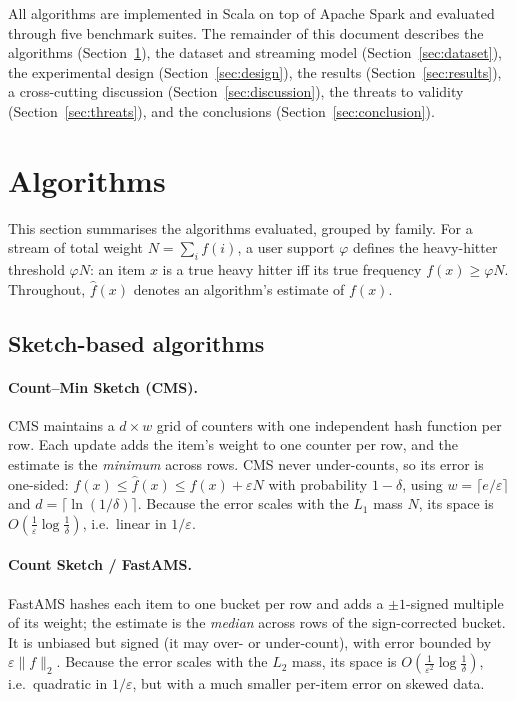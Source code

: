 \documentclass[12pt]{article}
\begin{document}
All algorithms are implemented in Scala on top of Apache Spark and evaluated
through five benchmark suites. The remainder of this document describes the
algorithms (Section~\ref{sec:algorithms}), the dataset and streaming model
(Section~\ref{sec:dataset}), the experimental design
(Section~\ref{sec:design}), the results (Section~\ref{sec:results}), a
cross-cutting discussion (Section~\ref{sec:discussion}), the threats to validity
(Section~\ref{sec:threats}), and the conclusions (Section~\ref{sec:conclusion}).

\section{Algorithms}
\label{sec:algorithms}

This section summarises the algorithms evaluated, grouped by family. For a
stream of total weight $N=\sum_i f(i)$, a user support $\varphi$ defines the
heavy-hitter threshold $\varphi N$: an item $x$ is a true heavy hitter iff its
true frequency $f(x) \ge \varphi N$. Throughout, $\hat f(x)$ denotes an
algorithm's estimate of $f(x)$.

\subsection{Sketch-based algorithms}

\paragraph{Count--Min Sketch (CMS).}
CMS maintains a $d \times w$ grid of counters with one independent hash function
per row. Each update adds the item's weight to one counter per row, and the
estimate is the \emph{minimum} across rows. CMS never under-counts, so its error
is one-sided: $f(x) \le \hat f(x) \le f(x) + \varepsilon N$ with probability
$1-\delta$, using $w=\lceil e/\varepsilon\rceil$ and $d=\lceil\ln(1/\delta)\rceil$.
Because the error scales with the $L_1$ mass $N$, its space is
$O\!\left(\tfrac{1}{\varepsilon}\log\tfrac{1}{\delta}\right)$, i.e.\ linear in
$1/\varepsilon$.

\paragraph{Count Sketch / FastAMS.}
FastAMS hashes each item to one bucket per row and adds a $\pm1$-signed multiple
of its weight; the estimate is the \emph{median} across rows of the
sign-corrected bucket. It is unbiased but signed (it may over- or under-count),
with error bounded by $\varepsilon\lVert f\rVert_2$. Because the error scales
with the $L_2$ mass, its space is
$O\!\left(\tfrac{1}{\varepsilon^2}\log\tfrac{1}{\delta}\right)$, i.e.\ quadratic
in $1/\varepsilon$, but with a much smaller per-item error on skewed data.
\end{document}
